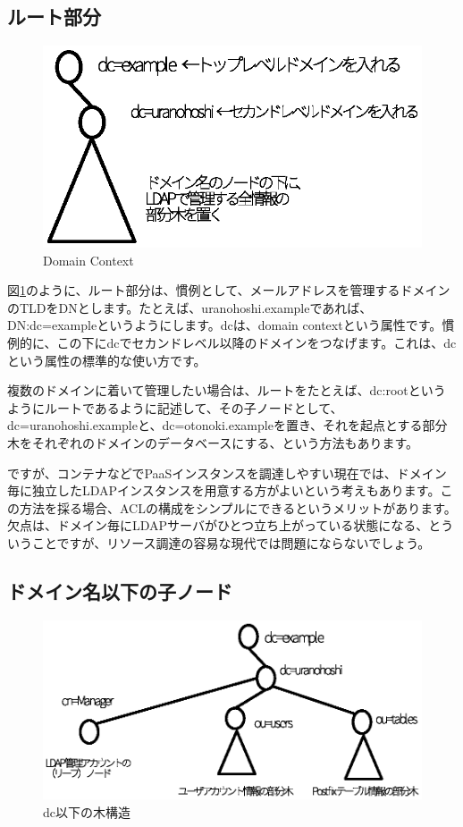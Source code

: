 \subsection{ルート部分}

\begin{figure}[htbp]
	\includegraphics[width=12cm,clip]{draw/dc.eps}
	\caption{Domain Context}
	\label{fig:dc}
\end{figure}

図\ref{fig:dc}のように、ルート部分は、慣例として、メールアドレスを管理するドメインのTLDをDNとします。たとえば、uranohoshi.exampleであれば、DN:dc=exampleというようにします。dcは、domain contextという属性です。慣例的に、この下にdcでセカンドレベル以降のドメインをつなげます。これは、dcという属性の標準的な使い方です。

複数のドメインに着いて管理したい場合は、ルートをたとえば、dc:rootというようにルートであるように記述して、その子ノードとして、dc=uranohoshi.exampleと、dc=otonoki.exampleを置き、それを起点とする部分木をそれぞれのドメインのデータベースにする、という方法もあります。

ですが、コンテナなどでPaaSインスタンスを調達しやすい現在では、ドメイン毎に独立したLDAPインスタンスを用意する方がよいという考えもあります。この方法を採る場合、ACLの構成をシンプルにできるというメリットがあります。欠点は、ドメイン毎にLDAPサーバがひとつ立ち上がっている状態になる、とういうことですが、リソース調達の容易な現代では問題にならないでしょう。

\subsection{ドメイン名以下の子ノード}

\begin{figure}[htbp]
	\includegraphics[width=12cm,clip]{draw/structure.eps}
	\caption{dc以下の木構造}
	\label{fig:structure}
\end{figure}

